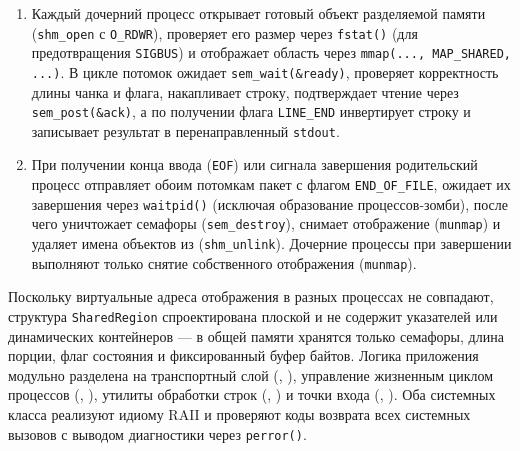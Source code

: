 \documentclass[11pt, a4paper]{article}
\begin{document}
\begin{enumerate}
\begin{itemize}
        \item если длина строки не превышает 10~символов ($\text{length} \le 10$), строка пересылается процессу \texttt{child1} через его сегмент разделяемой памяти.
    \end{itemize}
    Для поддержки строк произвольной длины без выхода за границы отображенной области передача организована порциями до \texttt{CHUNK\_SIZE} (4096~байт) с заголовком длины и флагом пакета (\texttt{DATA\_CHUNK}, \texttt{LINE\_END}, \texttt{END\_OF\_FILE}). Синхронизация каждого пакета выполняется по схеме подтверждения: запись данных $\rightarrow$ \texttt{sem\_post(\&ready)} $\rightarrow$ ожидание подтверждения \texttt{sem\_timedwait(\&ack)} с проверкой жизнеспособности потомка через \texttt{waitid(..., WNOHANG | WNOWAIT)}.
    \item Каждый дочерний процесс открывает готовый объект разделяемой памяти (\texttt{shm\_open} с \texttt{O\_RDWR}), проверяет его размер через \texttt{fstat()} (для предотвращения \texttt{SIGBUS}) и отображает область через \texttt{mmap(..., MAP\_SHARED, ...)}. В цикле потомок ожидает \texttt{sem\_wait(\&ready)}, проверяет корректность длины чанка и флага, накапливает строку, подтверждает чтение через \texttt{sem\_post(\&ack)}, а по получении флага \texttt{LINE\_END} инвертирует строку и записывает результат в перенаправленный \texttt{stdout}.
    \item При получении конца ввода (\texttt{EOF}) или сигнала завершения родительский процесс отправляет обоим потомкам пакет с флагом \texttt{END\_OF\_FILE}, ожидает их завершения через \texttt{waitpid()} (исключая образование процессов-зомби), после чего уничтожает семафоры (\texttt{sem\_destroy}), снимает отображение (\texttt{munmap}) и удаляет имена объектов из  (\texttt{shm\_unlink}). Дочерние процессы при завершении выполняют только снятие собственного отображения (\texttt{munmap}).
\end{enumerate}

Поскольку виртуальные адреса отображения в разных процессах не совпадают, структура \texttt{SharedRegion} спроектирована плоской и не содержит указателей или динамических контейнеров — в общей памяти хранятся только семафоры, длина порции, флаг состояния и фиксированный буфер байтов. Логика приложения модульно разделена на транспортный слой (, ), управление жизненным циклом процессов (, ), утилиты обработки строк (, ) и точки входа (, ). Оба системных класса реализуют идиому RAII и проверяют коды возврата всех системных вызовов с выводом диагностики через \texttt{perror()}.
\end{document}
